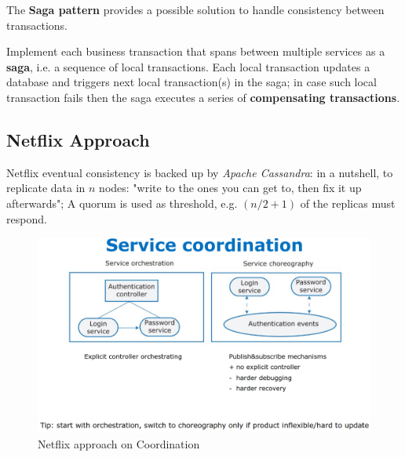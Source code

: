 The \textbf{Saga pattern} provides a possible solution to handle consistency between transactions.

Implement each business transaction that spans between multiple services as a \textbf{saga}, i.e.
a sequence of local transactions.
Each local transaction updates a database and triggers next local transaction(s) in the saga;
in case such local transaction fails then the saga executes a series of \textbf{compensating transactions}.


\subsection{Netflix Approach}

Netflix eventual consistency is backed up by \textit{Apache Cassandra}:
in a nutshell, to replicate data in $n$ nodes:
"write to the ones you can get to, then fix it up afterwards";
A quorum is used as threshold, e.g. $(n/2 + 1)$ of the replicas must respond.

\begin{figure}[htbp]
   \centering
   \includegraphics{images/netflix_coordination.png}
   \caption{Netflix approach on Coordination}
   \label{fig:netflix_coordination}
\end{figure}

